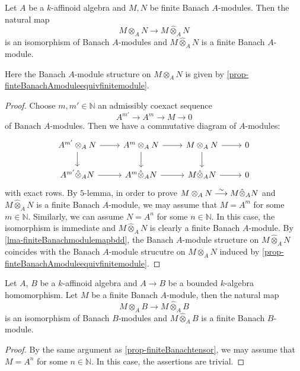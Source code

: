 \begin{proposition}\label{prop-finiteBanachtensor}
    Let $A$ be a $k$-affinoid algebra and $M,N$ be finite Banach $A$-modules. Then the natural map
    \[
        M\otimes_A N\rightarrow M\hat{\otimes}_A N
    \]
    is an isomorphism of Banach $A$-modules
    and $M\hat{\otimes}_A N$ is a finite Banach $A$-module.
\end{proposition}
Here the Banach $A$-module structure on $M\otimes_A N$ is given by \cref{prop-finteBanachAmoduleequivfinitemodule}.
\begin{proof}
    Choose $m,m'\in \mathbb{N}$ an admissibly coexact sequence
    \[
        A^{m'}\rightarrow A^m \rightarrow M\rightarrow 0  
    \]
    of Banach $A$-modules. Then we have a commutative diagram of $A$-modules:
    \[
        \begin{tikzcd}
            A^{m'}\otimes_A N \arrow[r] \arrow[d] & A^{m}\otimes_A N \arrow[r] \arrow[d] & M\otimes_A N \arrow[r] \arrow[d] & 0 \\
            A^{m'}\hat{\otimes}_A N \arrow[r]     & A^{m}\hat{\otimes}_A N \arrow[r]     & M\hat{\otimes}_A N \arrow[r]     & 0
        \end{tikzcd}  
    \]
    with exact rows. By $5$-lemma, in order to prove $M\otimes_A N\stackrel{\sim}{\longrightarrow} M\hat{\otimes}_A N$ and $M\hat{\otimes}_A N$ is a finite Banach $A$-module, we may assume that $M=A^m$ for some $m\in \mathbb{N}$. Similarly, we can assume $N=A^n$ for some $n\in \mathbb{N}$. In this case, the isomorphism is immediate and $M\hat{\otimes}_A N$ is clearly a finite Banach $A$-module. By \cref{lma-finiteBanachmodulemapbdd}, the Banach $A$-module structure on $M\hat{\otimes}_A N$ coincides with the Banach $A$-module strucutre on $M\otimes_A N$ induced by \cref{prop-finteBanachAmoduleequivfinitemodule}.
\end{proof}

\begin{proposition}\label{prop-finitemodulebasechange}
    Let $A$, $B$ be a $k$-affinoid algebra and $A\rightarrow B$ be a bounded $k$-algebra homomorphism. Let $M$ be a finite Banach $A$-module, then the natural map
    \[
        M\otimes_A B\rightarrow M\hat{\otimes}_A B  
    \]
    is an isomorphism of Banach $B$-modules and $M\hat{\otimes}_A B $ is a finite Banach $B$-module. 
\end{proposition}
\begin{proof}
    By the same argument as \cref{prop-finiteBanachtensor}, we may assume that $M=A^n$ for some $n\in \mathbb{N}$. In this case, the assertions are trivial.
\end{proof}

